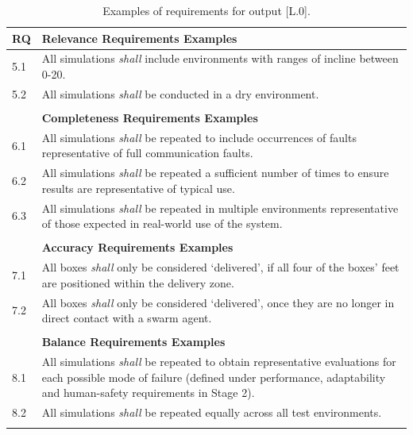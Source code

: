 \documentclass[runningheads]{llncs}
\begin{document}
\begin{table}[!t]%
	\centering
	\caption{Examples of requirements for output [L.0].}
	\vspace{-2ex}
	\label{tab:L0_req}
	\begin{tabular}{p{0.5cm} p{13.4cm}}%
	\textbf{RQ} & \textbf{Relevance Requirements Examples} \\
	\hline
	5.1 & All simulations \emph{shall} include environments with ranges of incline between 0-20\textdegree.\\
	\hline
	5.2 & All simulations \emph{shall} be conducted in a dry environment.\\
	\hline \\[-1.25\medskipamount]
	& \textbf{Completeness Requirements Examples} \\
	\hline
	6.1 & All simulations \emph{shall} be repeated to include occurrences of faults representative of full communication faults.\\
	\hline
	6.2 & All simulations \emph{shall} be repeated a sufficient number of times to ensure results are representative of typical use.\\
			\hline
			6.3 & All simulations \emph{shall} be repeated in multiple environments representative of those expected in real-world use of the system.\\
	\hline \\[-1.25\medskipamount]
	& \textbf{Accuracy Requirements Examples} \\
	\hline
	7.1 & All boxes \emph{shall} only be considered `delivered’, if all four of the boxes’ feet are positioned within the delivery zone.\\
	\hline
	7.2 & All boxes \emph{shall} only be considered `delivered’, once they are no longer in direct contact with a swarm agent.\\
	\hline \\[-1.25\medskipamount]
	& \textbf{Balance Requirements Examples} \\
	\hline
	8.1 & All simulations \emph{shall} be repeated to obtain representative evaluations for each possible mode of failure (defined under performance, adaptability and human-safety requirements in Stage 2).\\
	\hline
	8.2 & All simulations \emph{shall} be repeated equally across all test environments.\\
	\hline \\[-1\medskipamount] %
\end{tabular}
\vspace{-4ex}%
\end{table}
\end{document}
